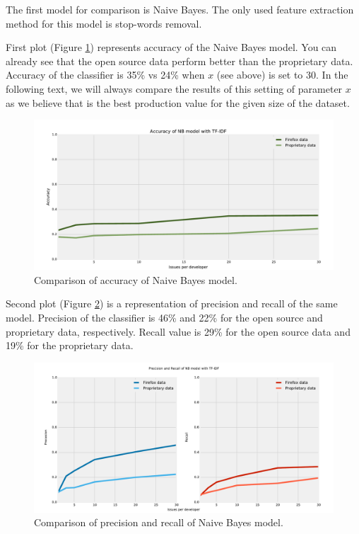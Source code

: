The first model for comparison is Naive Bayes. The only used feature extraction method for this model is stop-words removal.

First plot (Figure \ref{fig:results.datasets.nb_accuracy}) represents accuracy of the Naive Bayes model. You can already see that the open source data perform better than the proprietary data. Accuracy of the classifier is 35\% vs 24\% when $x$ (see above) is set to 30. In the following text, we will always compare the results of this setting of parameter $x$ as we believe that is the best production value for the given size of the dataset.

\begin{figure}[htbp]
    \centering
        \includegraphics[width=\textwidth]{./images/prop_vs_os/nb_accuracy.pdf}
    \caption{Comparison of accuracy of Naive Bayes model.}
    \label{fig:results.datasets.nb_accuracy}
\end{figure}

Second plot (Figure \ref{fig:results.datasets.nb_pr}) is a representation of precision and recall of the same model. Precision of the classifier is 46\% and 22\% for the open source and proprietary data, respectively. Recall value is 29\% for the open source data and 19\% for the proprietary data.

\begin{figure}[htbp]
    \centering
        \includegraphics[width=\textwidth]{./images/prop_vs_os/nb_precision_and_recall.pdf}
    \caption{Comparison of precision and recall of Naive Bayes model.}
    \label{fig:results.datasets.nb_pr}
\end{figure}


